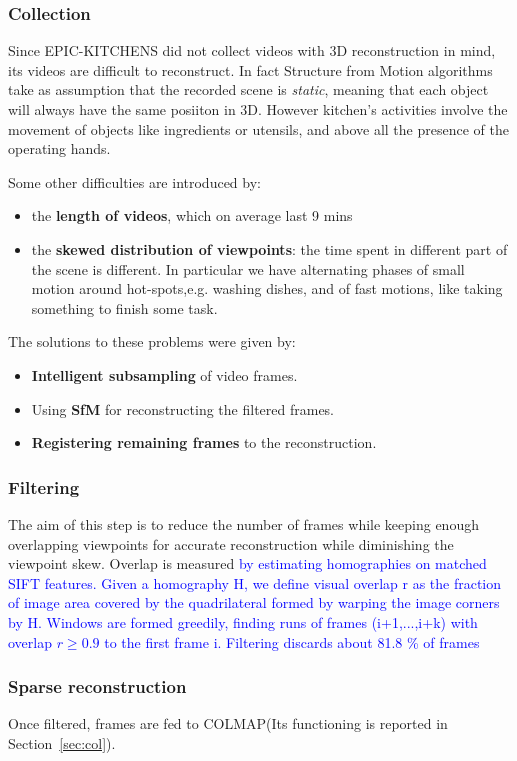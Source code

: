 \subsubsection{Collection}
Since EPIC-KITCHENS did not collect videos with 3D reconstruction in mind, its videos are difficult to reconstruct. In fact Structure from Motion algorithms take as assumption
that the recorded scene is \textit{static}, meaning that each object will always have the same posiiton in 3D. However kitchen's activities involve the movement of objects like 
ingredients or utensils, and above all the presence of the operating hands.

Some other difficulties are introduced by:
\begin{itemize}
    \item the \textbf{length of videos}, which on average last 9 mins
    \item the \textbf{skewed distribution of viewpoints}: the time spent in different part of the scene is different. In particular we have alternating phases of small motion
    around hot-spots,e.g. washing dishes, and of fast motions, like taking something to finish some task.
\end{itemize} 
The solutions to these problems were given by:
\begin{itemize}
    \item\textbf{ Intelligent subsampling} of video frames.
    \item Using \textbf{SfM} for reconstructing the filtered frames.
    \item \textbf{Registering remaining frames} to the reconstruction.
\end{itemize}

\subsubsection{Filtering}
The aim of this step is to reduce the number of frames while keeping enough overlapping viewpoints for accurate reconstruction while diminishing the viewpoint skew.
Overlap is measured \textcolor{blue}{by estimating homographies  on matched SIFT features. Given a homography H, we define visual overlap r as the fraction of image 
area covered by the quadrilateral formed by warping the image corners by H. Windows are formed greedily, finding runs of frames 
(i+1,...,i+k) with overlap $r\geq0.9$ to the first frame i. Filtering discards about 81.8 \% of frames}

\subsubsection{Sparse reconstruction}
Once filtered, frames are fed to COLMAP(Its functioning is reported in Section~\ref{sec:col}).
